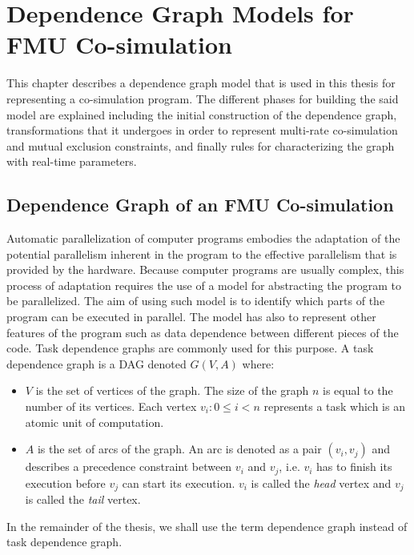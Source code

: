 \chapter{\label{ch:4-accel}Dependence Graph Models for FMU Co-simulation} 

\minitoc

This chapter describes a dependence graph model that is used in this thesis for representing a co-simulation program. The different phases for building the said model are explained including the initial construction of the dependence graph, transformations that it undergoes in order to represent multi-rate co-simulation and mutual exclusion constraints, and finally rules for characterizing the graph with real-time parameters.
 
\section{\label{sec:4-depgrph}Dependence Graph of an FMU Co-simulation}

Automatic parallelization of computer programs embodies the adaptation of the potential parallelism inherent in the program to the effective parallelism that is provided by the hardware. Because computer programs are usually complex, this process of adaptation requires the use of a model for abstracting the program to be parallelized. The aim of using such model is to identify which parts of the program can be executed in parallel. The model has also to represent other features of the program such as data dependence between different pieces of the code. Task dependence graphs are commonly used for this purpose. A task dependence graph is a DAG denoted $G(V,A)$ where:
\begin{itemize}
\item $V$ is the set of vertices of the graph. The size of the graph $n$ is equal to the number of its vertices. Each vertex $v_i: 0 \leq i < n$ represents a task which is an atomic unit of computation.
\item $A$ is the set of arcs of the graph. An arc is denoted as a pair $(v_i,v_j)$ and describes a precedence constraint between $v_i$ and $v_j$, i.e. $v_i$ has to finish its execution before $v_j$ can start its execution. $v_i$ is called the \textit{head} vertex and $v_j$ is called the \textit{tail} vertex. 
\end{itemize}

In the remainder of the thesis, we shall use the term dependence graph instead of task dependence graph.

